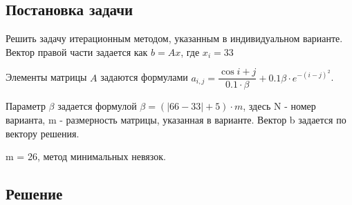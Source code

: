 \documentclass[a4paper,12pt]{report} %
\begin{document}
\subsection*{Постановка задачи}

Решить задачу итерационным методом, указанным в индивидуальном варианте. Вектор правой части задается как $b = Ax$, где $x_i = 33$

Элементы матрицы $A$ задаются формулами \newline $a_{i, j} = \dfrac{\cos{i + j}}{0.1 \cdot \beta} + 0.1\beta \cdot e^{-(i - j)^2}$.

Параметр $\beta$ задается формулой $\beta = (|66 - 33| + 5) \cdot m$, здесь N - номер варианта, m - размерность матрицы, указанная в варианте. Вектор b задается по вектору решения.

m = 26, метод минимальных невязок.


\subsection*{Решение}
\end{document}
